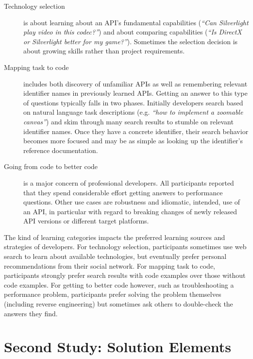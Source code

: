 \begin{description}
\item[Technology selection] is about learning about an API's fundamental capabilities (\emph{``Can Silverlight play video in this codec?''}) and about comparing capabilities (\emph{``Is DirectX or Silverlight better for my game?''}). Sometimes the selection decision is about growing skills rather than project requirements. 

\item[Mapping task to code] includes both discovery of unfamiliar APIs as well as remembering relevant identifier names in previously learned APIs. Getting an answer to this type of questions typically falls in two phases. Initially developers search based on natural language task descriptions (e.g. \emph{``how to implement a zoomable canvas''}) and skim through many search results to stumble on relevant identifier names. Once they have a concrete identifier, their search behavior becomes more focused and may be as simple as looking up the identifier's reference documentation.

\item[Going from code to better code] is a major concern of professional developers. All participants reported that they spend considerable effort getting answers to performance questions. Other use cases are robustness and idiomatic, \ie intended, use of an API, in particular with regard to breaking changes of newly released API versions or different target platforms.

\end{description}

The kind of learning categories impacts the preferred learning sources and strategies of developers. For technology selection, participants sometimes use web search to learn about available technologies, but eventually prefer personal recommendations from their social network.  For mapping task to code, participants strongly prefer search results with code examples over those without code examples. For getting to better code however, such as troubleshooting a performance problem, participants prefer solving the problem themselves (including reverse engineering) but sometimes ask others to double-check the answers they find.

\moarsauce
\section{Second Study: Solution Elements}

